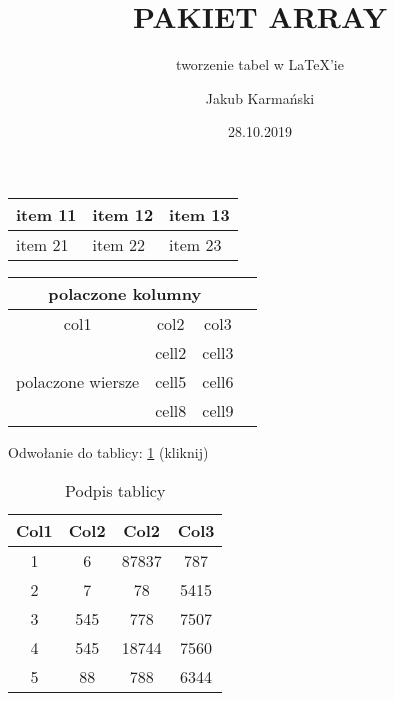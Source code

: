 \documentclass[table]{beamer}
\title{PAKIET ARRAY}
\subtitle{tworzenie tabel w LaTeX'ie}
\author{Jakub Karmański}
\institute{POLSL}
\date{28.10.2019}
\begin{document}
 
\maketitle

\listoftables %

\begin{frame}
\begin{tabularx}{0.8\textwidth} { 
  | >{\raggedright\arraybackslash}X 
  | >{\centering\arraybackslash}X 
  | >{\raggedleft\arraybackslash}X | }
 \hline
 item 11 & item 12 & item 13 \\
 \hline
 item 21  & item 22  & item 23  \\
\hline
\end{tabularx}
\end{frame}


\begin{frame}
\begin{center}
\begin{tabular}{ |c|c|c|c| } 
\hline
 \multicolumn{3}{|c|}{polaczone kolumny} \\
 \hline
col1 & col2 & col3 \\
\hline
\multirow{3}{4em}{polaczone wiersze} & cell2 & cell3 \\ 
& cell5 & cell6 \\ 
& cell8 & cell9 \\ 
\hline
\end{tabular}
\end{center}
\end{frame}



\begin{frame}
Odwołanie do tablicy:  \ref{table:1} (kliknij)
\end{frame}

\begin{frame}
\begin{table}[ht!]
\centering
\begin{tabular}{||c c c c||} 
 \hline
 Col1 & Col2 & Col2 & Col3 \\ [0.5ex] 
 \hline\hline
 1 & 6 & 87837 & 787 \\ 
 2 & 7 & 78 & 5415 \\
 3 & 545 & 778 & 7507 \\
 4 & 545 & 18744 & 7560 \\
 5 & 88 & 788 & 6344 \\ [1ex] 
 \hline
\end{tabular}
\caption{Podpis tablicy}
\label{table:1}
\end{table}
\end{frame}
\end{document}

